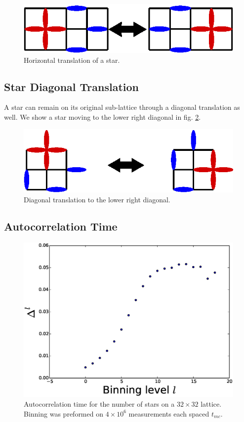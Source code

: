 \documentclass[aps,floatfix,11pt]{revtex4-1}
\begin{document}
\begin{figure}[h]
    \centering
    \includegraphics[width=8.5 cm]{move_right_left}
    \caption{Horizontal translation of a star.
\label{fig:move_right_left}}
\end{figure}


\subsection{Star Diagonal Translation}
A star can remain on its original sub-lattice through a diagonal translation as well. We show a star moving
to the lower right diagonal in fig. \ref{fig:diag}. 
\begin{figure}[h]
    \centering
    \includegraphics[width=8.5 cm]{diag}
    \caption{Diagonal translation to the lower right diagonal.
\label{fig:diag}}
\end{figure}

\clearpage
\subsection{Autocorrelation Time}

\begin{figure}[h]
    \centering
    \includegraphics[width=8.5 cm]{auto_cor_num_stars}
    \caption{Autocorrelation time for the number of stars on a $32\times 32$ lattice. Binning was preformed on $4\times 10^6$
    measurements each spaced $t_{mc}$. \label{fig:auto_cor_num_stars}}
\end{figure}
\end{document}
